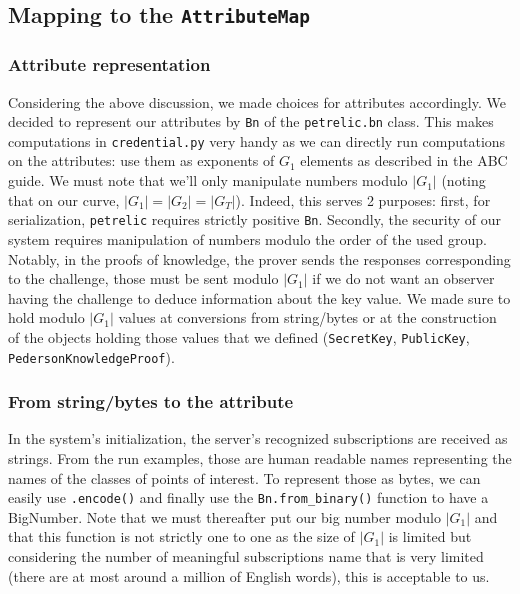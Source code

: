 \documentclass[10pt,conference,compsocconf]{IEEEtran}
\begin{document}
\subsection{Mapping to the \texttt{AttributeMap}}
\subsubsection{Attribute representation}
Considering the above discussion, we made choices for attributes accordingly. We decided to represent our attributes by \texttt{Bn} of the \texttt{petrelic.bn} class. This makes computations in \texttt{credential.py} very handy as we can directly run computations on the attributes: use them as exponents of $G_1$ elements as described in the ABC guide. We must note that we'll only manipulate numbers modulo $|G_1|$ (noting that on our curve, $|G_1|=|G_2|=|G_T|$). Indeed, this serves 2 purposes: first, for serialization, \texttt{petrelic} requires strictly positive \texttt{Bn}. Secondly, the security of our system requires manipulation of numbers modulo the order of the used group. Notably, in the proofs of knowledge, the prover sends the responses corresponding to the challenge, those must be sent modulo $|G_1|$ if we do not want an observer having the challenge to deduce information about the key value. We made sure to hold modulo $|G_1|$ values at conversions from string/bytes or at the construction of the objects holding those values that we defined (\texttt{SecretKey}, \texttt{PublicKey}, \texttt{PedersonKnowledgeProof}).

\subsubsection{From string/bytes to the attribute}
In the system's initialization, the server's recognized subscriptions are received as strings. From the run examples, those are human readable names representing the names of the classes of points of interest. To represent those as bytes, we can easily use \texttt{.encode()} and finally use the \texttt{Bn.from\_binary()} function to have a BigNumber. Note that we must thereafter put our big number modulo $|G_1|$ and that this function is not strictly one to one as the size of $|G_1|$ is limited but considering the number of meaningful subscriptions name that is very limited (there are at most around a million of English words\cite{noauthor_how_2020}), this is acceptable to us.
\end{document}
